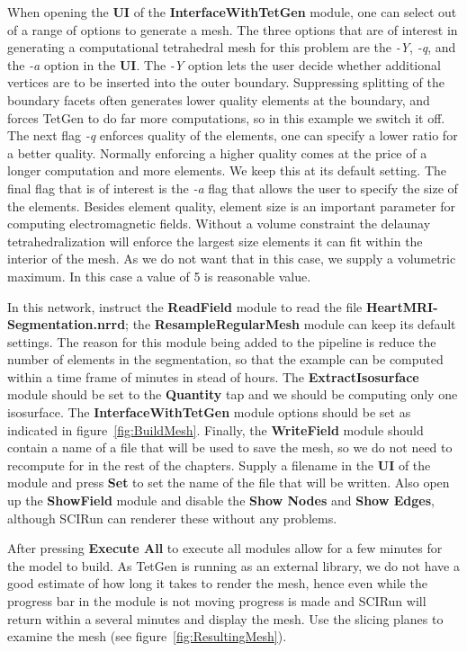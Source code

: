 \documentclass[fleqn,11pt,openany]{book}
\begin{document}
When opening the {\bf UI} of the  {\bf InterfaceWithTetGen} module, one can select out of a range of options to generate a mesh. The three options that are of interest in generating a computational tetrahedral mesh for this problem are the {\em -Y}, {\em -q}, and the {\em -a} option in the {\bf UI}. The {\em -Y} option lets the user decide whether additional vertices are to be inserted into the outer boundary. Suppressing splitting of the boundary facets often generates lower quality elements at the boundary, and forces TetGen to do far more computations, so in this example we switch it off. The next flag {\em -q} enforces quality of the elements, one can specify a lower ratio for a better quality. Normally enforcing a higher quality comes at the price of a longer computation and more elements. We keep this at its default setting. The final flag that is of interest is the {\em -a} flag that allows the user to specify the size of the elements. Besides element quality, element size is an important parameter for computing electromagnetic fields. Without a volume constraint the delaunay tetrahedralization will enforce the largest size elements it can fit within the interior of the mesh. As we do not want that in this case, we supply a volumetric maximum. In this case a value of 5 is reasonable value.

In this network, instruct the {\bf ReadField} module to read the file \textbf{HeartMRI-Segmentation.nrrd};
the \textbf{ResampleRegularMesh} module can keep its default settings. The reason for this module being added to the pipeline is reduce the number of elements in the segmentation, so that the example can be computed within a time frame of minutes in stead of hours. The {\bf ExtractIsosurface} module should be set to the {\bf Quantity }tap and we should be computing only one isosurface. The {\bf InterfaceWithTetGen} module options should be set as indicated in figure~\ref{fig:BuildMesh}. Finally, the {\bf WriteField} module should contain a name of a file that will be used to save the mesh, so we do not need to recompute for in the rest of the chapters. Supply a filename in the {\bf UI} of the module and press {\bf Set} to set the name of the file that will be written. Also open up the {\bf ShowField} module and disable the {\bf Show Nodes} and {\bf Show Edges}, although SCIRun can renderer these without any problems.

After pressing {\bf Execute All} to execute all modules allow for a few minutes for the model to build. As TetGen is running as an external library, we do not have a good estimate of how long it takes to render the mesh, hence even while the progress bar in the module is not moving progress is made and SCIRun will return within a several minutes and display the mesh. Use the slicing planes to examine the mesh (see figure~\ref{fig:ResultingMesh}).
\end{document}
